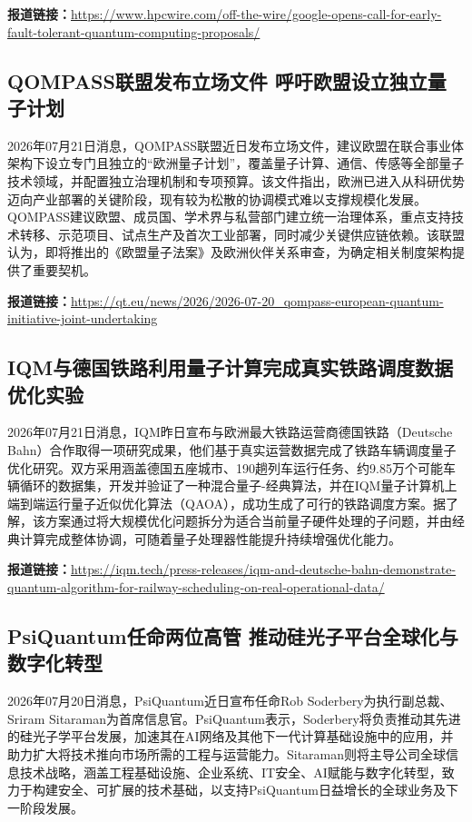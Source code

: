 \documentclass[12pt,a4paper]{ctexart}
\begin{document}
\noindent\textbf{报道链接：}\url{https://www.hpcwire.com/off-the-wire/google-opens-call-for-early-fault-tolerant-quantum-computing-proposals/}

\subsection{ QOMPASS联盟发布立场文件 呼吁欧盟设立独立量子计划 }

2026年07月21日消息，QOMPASS联盟近日发布立场文件，建议欧盟在联合事业体架构下设立专门且独立的“欧洲量子计划”，覆盖量子计算、通信、传感等全部量子技术领域，并配置独立治理机制和专项预算。该文件指出，欧洲已进入从科研优势迈向产业部署的关键阶段，现有较为松散的协调模式难以支撑规模化发展。QOMPASS建议欧盟、成员国、学术界与私营部门建立统一治理体系，重点支持技术转移、示范项目、试点生产及首次工业部署，同时减少关键供应链依赖。该联盟认为，即将推出的《欧盟量子法案》及欧洲伙伴关系审查，为确定相关制度架构提供了重要契机。

\noindent\textbf{报道链接：}\url{https://qt.eu/news/2026/2026-07-20\_qompass-european-quantum-initiative-joint-undertaking}

\subsection{ IQM与德国铁路利用量子计算完成真实铁路调度数据优化实验 }

2026年07月21日消息，IQM昨日宣布与欧洲最大铁路运营商德国铁路（Deutsche Bahn）合作取得一项研究成果，他们基于真实运营数据完成了铁路车辆调度量子优化研究。双方采用涵盖德国五座城市、190趟列车运行任务、约9.85万个可能车辆循环的数据集，开发并验证了一种混合量子-经典算法，并在IQM量子计算机上端到端运行量子近似优化算法（QAOA），成功生成了可行的铁路调度方案。据了解，该方案通过将大规模优化问题拆分为适合当前量子硬件处理的子问题，并由经典计算完成整体协调，可随着量子处理器性能提升持续增强优化能力。

\noindent\textbf{报道链接：}\url{https://iqm.tech/press-releases/iqm-and-deutsche-bahn-demonstrate-quantum-algorithm-for-railway-scheduling-on-real-operational-data/}

\subsection{ PsiQuantum任命两位高管 推动硅光子平台全球化与数字化转型 }

2026年07月20日消息，PsiQuantum近日宣布任命Rob Soderbery为执行副总裁、Sriram Sitaraman为首席信息官。PsiQuantum表示，Soderbery将负责推动其先进的硅光子学平台发展，加速其在AI网络及其他下一代计算基础设施中的应用，并助力扩大将技术推向市场所需的工程与运营能力。Sitaraman则将主导公司全球信息技术战略，涵盖工程基础设施、企业系统、IT安全、AI赋能与数字化转型，致力于构建安全、可扩展的技术基础，以支持PsiQuantum日益增长的全球业务及下一阶段发展。
\end{document}
